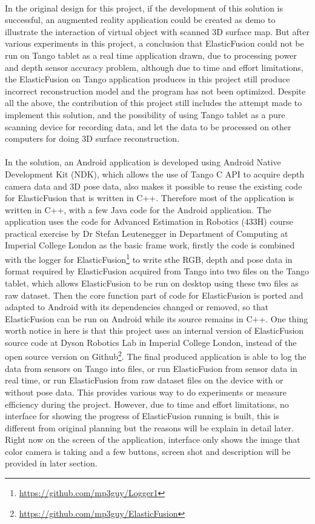 \documentclass[12pt,twoside]{article}
\begin{document}
\\
In the original design for this project, if the development of this solution is successful, an augmented reality application could be created as demo to illustrate the interaction of virtual object with scanned 3D surface map. But after various experiments in this project, a conclusion that ElasticFusion could not be run on Tango tablet as a real time application drawn, due to processing power and depth sensor accuracy problem, although due to time and effort limitations, the ElasticFusion on Tango application produces in this project still produce incorrect reconstruction model and the program has not been optimized. Despite all the above, the contribution of this project still includes the attempt made to implement this solution, and the possibility of using Tango tablet as a pure scanning device for recording data, and let the data to be processed on other computers for doing 3D surface reconstruction.\\
\\
In the solution, an Android application is developed using Android Native Development Kit (NDK), which allows the use of Tango C API to acquire depth camera data and 3D pose data, also makes it possible to reuse the existing code for ElasticFusion that is written in C++. Therefore most of the application is written in C++, with a few Java code for the Android application. The application uses the code for Advanced Estimation in Robotics (433H) course practical exercise by Dr Stefan Leutenegger in Department of Computing at Imperial College London as the basic frame work, firstly the code is combined with the logger for ElasticFusion\footnote{\url{https://github.com/mp3guy/Logger1}} to write sthe RGB, depth and pose data in format required by ElasticFusion acquired from Tango into two files on the Tango tablet, which allows ElasticFusion to be run on desktop using these two files as raw dataset. Then the core function part of code for ElasticFusion is ported and adapted to Android with its dependencies changed or removed, so that ElasticFusion can be run on Android while its source remains in C++. One thing worth notice in here is that this project uses an internal version of ElasticFusion source code at Dyson Robotics Lab in Imperial College London, instead of the open source version on Github\footnote{\url{https://github.com/mp3guy/ElasticFusion}}. The final produced application is able to log the data from sensors on Tango into files, or run ElasticFusion from sensor data in real time, or run ElasticFusion from raw dataset files on the device with or without pose data. This provides various way to do experiments or measure  efficiency during the project. However, due to time and effort limitations, no interface for showing the progress of ElasticFusion running is built, this is different from original planning but the reasons will be explain in detail later. Right now on the screen of the application, interface only shows the image that color camera is taking and a few buttons, screen shot and description will be provided in later section.\\
\end{document}
